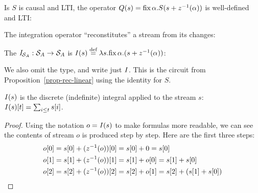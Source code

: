 \begin{proposition}
\label{prop-rec-linear}
Is $S$ is causal and LTI, the operator
$Q(s)=\mbox{fix}\,\alpha.S(s+z^{-1}(\alpha))$ is well-defined and LTI:

\begin{center}
\end{center}
\end{proposition}

The integration operator ``reconstitutes'' a stream from its changes:

\begin{definition}[Integration]
The  $\mathit{I}_{\mathcal{S}_{A}} : \mathcal{S}_{A} \to
\mathcal{S}_{A}$ is $\mathit{I}(s) \stackrel{\textrm{\scriptsize def}}{=} \lambda s . \mbox{fix}\,\alpha.(s +
  z^{-1}(\alpha))$:
\begin{center}
\end{center}
\end{definition}

\noindent
We also omit the type, and write just $\mathit{I}$.  This is the circuit from
Proposition~\ref{prop-rec-linear} using the identity for $S$.

\begin{proposition}
$\mathit{I}(s)$ is the discrete (indefinite) integral applied to the stream $s$:
$\mathit{I}(s)[t] = \sum_{i \leq t} s[i]$.
\end{proposition}
\begin{proof}
Using the notation $o = \mathit{I}(s)$ to make formulas more readable, we can
see the contents of stream $o$ is produced step by step.  Here are the
first three steps:
\begin{align*}
  o[0] &= s[0] + (z^{-1}(o))[0] = s[0] + 0 = s[0] \\
  o[1] &= s[1] + (z^{-1}(o))[1] = s[1] + o[0] = s[1] + s[0] \\
  o[2] &= s[2] + (z^{-1}(o))[2] = s[2] + o[1] = s[2] + (s[1] + s[0])
\end{align*}
\end{proof}

